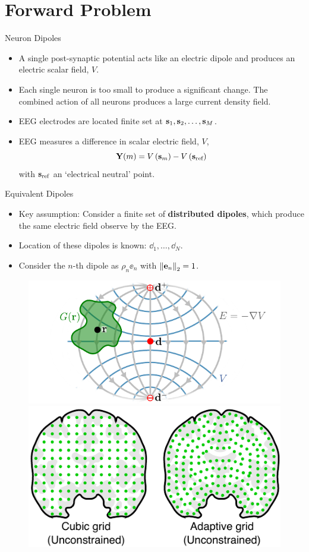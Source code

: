 \documentclass[progressbar=head]{beamer}
\begin{document}
{
\section{Forward Problem}
}

\begin{frame}{Neuron Dipoles}
\begin{itemize}
\item A single post-synaptic potential 
acts like an electric dipole and
produces an electric scalar field, $V$. 
\item Each single neuron is too small to produce a significant change. The combined action of all neurons produces a large current density field.
\item EEG electrodes are located finite set at $\mathbf{s}_1, \mathbf{s}_2, \dots, \mathbf{s}_M$.
\item EEG measures a difference in scalar electric field, $V$,
\begin{equation}
\mathbf{Y}(m) = V\left( \mathbf{s}_m \right) - V\left( \mathbf{s}_\text{ref} \right)
\end{equation}
with $\mathbf{s}_\text{ref}$ an `electrical neutral' point.
\end{itemize}
\end{frame}

\begin{frame}{Equivalent Dipoles}
\begin{itemize}
\item \alert{Key assumption:} Consider a finite set of \textbf{distributed dipoles}, which produce the same electric field observe by the EEG.
\item Location of these dipoles is known: $\dd_1, \dots, \dd_N$.
\item Consider the $n$-th dipole as $\rho_n \ee_n$ with $\left\lVert \mathbf{e}_n \right\rVert_2=1$.
\end{itemize}
\begin{figure}
\centering
\includegraphics[width=0.45\linewidth]{./img/CurrDensField}
\includegraphics[width=0.45\linewidth]{./img/Pregions_pic_radial_v2}
\end{figure}
\end{frame}
\end{document}
